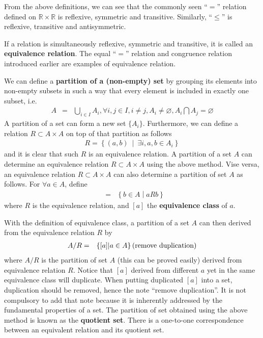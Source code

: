 From the above definitions, we can see that the commonly seen ``$=$'' relation defined on $\mathbb{R}\times\mathbb{R}$ is reflexive, symmetric and transitive. Similarly, ``$\leq$'' is reflexive, transitive and antisymmetric.

If a relation is simultaneously reflexive, symmetric and transitive, it is called an \textbf{equivalence relation}. The equal ``$=$'' relation and congruence relation introduced earlier are examples of equivalence relation.

We can define a \textbf{partition of a (non-empty) set} by grouping its elements into non-empty subsets in such a way that every element is included in exactly one subset, i.e.
\begin{eqnarray}
	A &=& \bigcup_{i\in I}A_i, \forall i, j \in I, i\neq j, A_i \neq \varnothing, A_i \bigcap A_j = \varnothing \nonumber
\end{eqnarray}
A partition of a set can form a new set $\{A_i\}$. Furthermore, we can define a relation $R\subset A \times A$ on top of that partition as follows
\begin{eqnarray}
	R = \left\{(a,b)~\middle|~\exists i, a,b \in A_i\right\} \nonumber
\end{eqnarray}
and it is clear that such $R$ is an equivalence relation. A partition of a set $A$ can determine an equivalence relation $R\subset A\times A$ using the above method. Vise versa, an equivalence relation $R\subset A\times A$ can also determine a partition of set $A$ as follows. For $\forall a \in A$, define
\begin{eqnarray}
	[a] &=& \left\{b \in A\middle| aRb \right\} \nonumber
\end{eqnarray}
where $R$ is the equivalence relation, and $[a]$ the \textbf{equivalence class} of $a$. 

With the definition of equivalence class, a partition of a set $A$ can then derived from the equivalence relation $R$ by
\begin{eqnarray}
	A/R &=& \left\{[a] | a \in A \right\} \textup{(remove duplication)} \label{eq:quotient_set}
\end{eqnarray}
where $A/R$ is the partition of set $A$ (this can be proved easily) derived from equivalence relation $R$. Notice that $[a]$ derived from different $a$ yet in the same equivalence class will duplicate. When putting duplicated $[a]$ into a set, duplication should be removed, hence the note ``remove duplication''. It is not compulsory to add that note because it is inherently addressed by the fundamental properties of a set. The partition of set obtained using the above method is known as the \textbf{quotient set}. There is a one-to-one correspondence between an equivalent relation and its quotient set.

